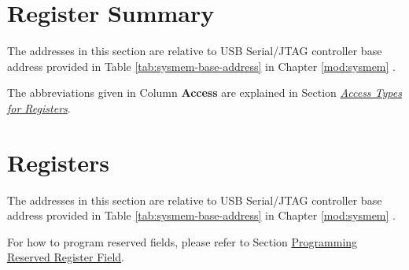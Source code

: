 \documentclass[main\_\_EN.tex]{subfiles}
\begin{document}

\newpage
\hypertarget{usbserialjtag-reg-summ}{}
\section{Register Summary}
\label{sec:usbserialjtag-reg-summ}

The addresses in this section are relative to USB Serial/JTAG controller base address provided in Table \ref{tab:sysmem-base-address} in Chapter \ref{mod:sysmem} \textit{}.

The abbreviations given in Column \textbf{Access} are explained in Section \hyperref[glossary-access-types]{\textit{Access Types for Registers}}.






\newpage
\section{Registers}

The addresses in this section are relative to USB Serial/JTAG controller base address provided in Table \ref{tab:sysmem-base-address} in Chapter \ref{mod:sysmem} \textit{}.

For how to program reserved fields, please refer to Section \hyperref[programming-reserved-field]{Programming Reserved Register Field}.


\end{document}
